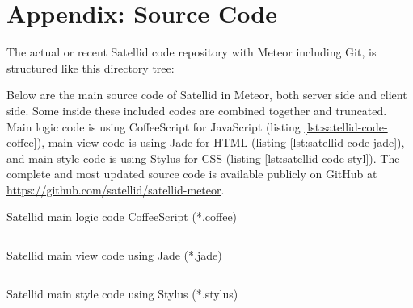 \chapter{Appendix: Source Code}
\label{apx:source-code}

The actual or recent Satellid code repository with Meteor including Git, is structured like this directory tree:


\noindent Below are the main source code of Satellid in Meteor, both server side and client side.
Some inside these included codes are combined together and truncated.
Main logic code is using CoffeeScript for JavaScript (listing \autoref{lst:satellid-code-coffee}), main view code is using Jade for HTML (listing \autoref{lst:satellid-code-jade}), and main style code is using Stylus for CSS (listing \autoref{lst:satellid-code-styl}).
The complete and most updated source code is available publicly on GitHub at \url{https://github.com/satellid/satellid-meteor}.

\begin{listing}[tbp]
  \caption[Satellid main logic code]{Satellid main logic code CoffeeScript (*.coffee)}
  \inputminted{coffeescript}{\dir/code/.snippets/satellid.coffee}
  \label{lst:satellid-code-coffee}
\end{listing}

\begin{listing}[tbp]
  \caption[Satellid main view code]{Satellid main view code using Jade (*.jade)}
  \inputminted{jade}{\dir/code/.snippets/satellid.jade}
  \label{lst:satellid-code-jade}
\end{listing}

\begin{listing}[tbp]
  \caption[Satellid main style code]{Satellid main style code using Stylus (*.stylus)}
  \inputminted{css}{\dir/code/.snippets/satellid.styl}
  \label{lst:satellid-code-styl}
\end{listing}
